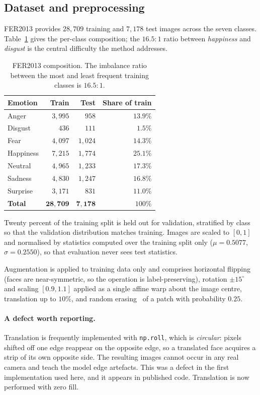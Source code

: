 \documentclass[11pt,a4paper]{article}
\begin{document}
\subsection{Dataset and preprocessing}
\label{sec:data}
FER2013 provides $28{,}709$ training and $7{,}178$ test images across the seven
classes. Table~\ref{tab:dataset} gives the per-class composition; the
$16.5{:}1$ ratio between \emph{happiness} and \emph{disgust} is the central
difficulty the method addresses.

\begin{table}[htbp]
\centering
\small
\begin{tabular}{lrrr}
\toprule
Emotion & Train & Test & Share of train \\
\midrule
Anger      & $3{,}995$  & $958$     & $13.9\%$ \\
Disgust    & $436$      & $111$     & $1.5\%$ \\
Fear       & $4{,}097$  & $1{,}024$ & $14.3\%$ \\
Happiness  & $7{,}215$  & $1{,}774$ & $25.1\%$ \\
Neutral    & $4{,}965$  & $1{,}233$ & $17.3\%$ \\
Sadness    & $4{,}830$  & $1{,}247$ & $16.8\%$ \\
Surprise   & $3{,}171$  & $831$     & $11.0\%$ \\
\midrule
\textbf{Total} & $\mathbf{28{,}709}$ & $\mathbf{7{,}178}$ & $100\%$ \\
\bottomrule
\end{tabular}
\caption{FER2013 composition. The imbalance ratio between the most and least
frequent training classes is $16.5{:}1$.}
\label{tab:dataset}
\end{table}

Twenty percent of the training split is held out for validation, stratified by
class so that the validation distribution matches training. Images are scaled
to $[0,1]$ and normalised by statistics computed over the training split only
($\mu = 0.5077$, $\sigma = 0.2550$), so that evaluation never sees test
statistics.

Augmentation is applied to training data only and comprises horizontal flipping
(faces are near-symmetric, so the operation is label-preserving), rotation
$\pm15^\circ$ and scaling $[0.9,1.1]$ applied as a single affine warp about the
image centre, translation up to $10\%$, and random
erasing~\cite{zhong2020random} of a patch with probability $0.25$.

\paragraph{A defect worth reporting.}
Translation is frequently implemented with \texttt{np.roll}, which is
\emph{circular}: pixels shifted off one edge reappear on the opposite edge, so
a translated face acquires a strip of its own opposite side. The resulting
images cannot occur in any real camera and teach the model edge artefacts. This
was a defect in the first implementation used here, and it appears in published
code. Translation is now performed with zero fill.
\end{document}
